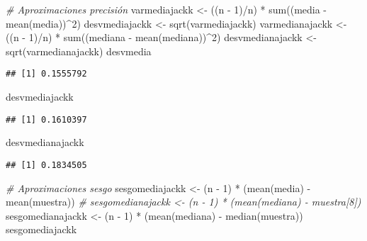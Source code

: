 \documentclass[
]{book}
\newenvironment{Shaded}{\begin{snugshade}}{\end{snugshade}}
\newcommand{\CommentTok}[1]{\textcolor[rgb]{0.56,0.35,0.01}{\textit{#1}}}
\newcommand{\DecValTok}[1]{\textcolor[rgb]{0.00,0.00,0.81}{#1}}
\newcommand{\FunctionTok}[1]{\textcolor[rgb]{0.00,0.00,0.00}{#1}}
\newcommand{\NormalTok}[1]{#1}
\newcommand{\OtherTok}[1]{\textcolor[rgb]{0.56,0.35,0.01}{#1}}
\newcommand{\SpecialCharTok}[1]{\textcolor[rgb]{0.00,0.00,0.00}{#1}}
\theoremstyle{break}
\theoremstyle{definition}
\theoremstyle{definition}
\theoremstyle{definition}
\theoremstyle{definition}
\theoremstyle{remark}
\begin{document}
\begin{Shaded}
\begin{Highlighting}[]
\CommentTok{\# Aproximaciones precisión}
\NormalTok{varmediajackk }\OtherTok{\textless{}{-}}\NormalTok{ ((n }\SpecialCharTok{{-}} \DecValTok{1}\NormalTok{)}\SpecialCharTok{/}\NormalTok{n) }\SpecialCharTok{*} \FunctionTok{sum}\NormalTok{((media }\SpecialCharTok{{-}} \FunctionTok{mean}\NormalTok{(media))}\SpecialCharTok{\^{}}\DecValTok{2}\NormalTok{)}
\NormalTok{desvmediajackk }\OtherTok{\textless{}{-}} \FunctionTok{sqrt}\NormalTok{(varmediajackk)}
\NormalTok{varmedianajackk }\OtherTok{\textless{}{-}}\NormalTok{ ((n }\SpecialCharTok{{-}} \DecValTok{1}\NormalTok{)}\SpecialCharTok{/}\NormalTok{n) }\SpecialCharTok{*} \FunctionTok{sum}\NormalTok{((mediana }\SpecialCharTok{{-}} \FunctionTok{mean}\NormalTok{(mediana))}\SpecialCharTok{\^{}}\DecValTok{2}\NormalTok{)}
\NormalTok{desvmedianajackk }\OtherTok{\textless{}{-}} \FunctionTok{sqrt}\NormalTok{(varmedianajackk)}
\NormalTok{desvmedia}
\end{Highlighting}
\end{Shaded}

\begin{verbatim}
## [1] 0.1555792
\end{verbatim}

\begin{Shaded}
\begin{Highlighting}[]
\NormalTok{desvmediajackk}
\end{Highlighting}
\end{Shaded}

\begin{verbatim}
## [1] 0.1610397
\end{verbatim}

\begin{Shaded}
\begin{Highlighting}[]
\NormalTok{desvmedianajackk}
\end{Highlighting}
\end{Shaded}

\begin{verbatim}
## [1] 0.1834505
\end{verbatim}

\begin{Shaded}
\begin{Highlighting}[]
\CommentTok{\# Aproximaciones sesgo}
\NormalTok{sesgomediajackk }\OtherTok{\textless{}{-}}\NormalTok{ (n }\SpecialCharTok{{-}} \DecValTok{1}\NormalTok{) }\SpecialCharTok{*}\NormalTok{ (}\FunctionTok{mean}\NormalTok{(media) }\SpecialCharTok{{-}} \FunctionTok{mean}\NormalTok{(muestra))}
\CommentTok{\# sesgomedianajackk \textless{}{-} (n {-} 1) * (mean(mediana) {-} muestra[8])}
\NormalTok{sesgomedianajackk }\OtherTok{\textless{}{-}}\NormalTok{ (n }\SpecialCharTok{{-}} \DecValTok{1}\NormalTok{) }\SpecialCharTok{*}\NormalTok{ (}\FunctionTok{mean}\NormalTok{(mediana) }\SpecialCharTok{{-}} \FunctionTok{median}\NormalTok{(muestra))}
\NormalTok{sesgomediajackk}
\end{Highlighting}
\end{Shaded}
\end{document}
